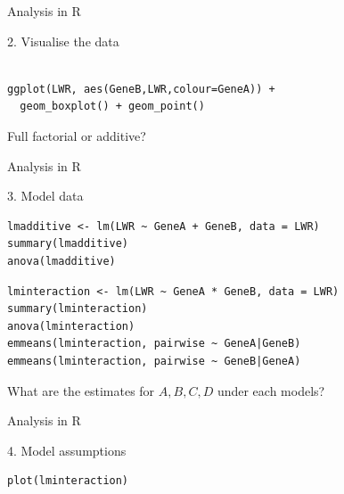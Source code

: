 \documentclass[10pt]{beamer}
\makeatletter
\newenvironment{kframe}{%
 \def\at@end@of@kframe{}%
 \ifinner\ifhmode%
  \def\at@end@of@kframe{\end{minipage}}%
  \begin{minipage}{\columnwidth}%
 \fi\fi%
 \def\FrameCommand##1{\hskip\@totalleftmargin \hskip-\fboxsep
 \colorbox{shadecolor}{##1}\hskip-\fboxsep
     \hskip-\linewidth \hskip-\@totalleftmargin \hskip\columnwidth}%
 \MakeFramed {\advance\hsize-\width
   \@totalleftmargin\z@ \linewidth\hsize
   \@setminipage}}%
 {\par\unskip\endMakeFramed%
 \at@end@of@kframe}
\newenvironment{knitrout}{}{} %
\makeatother
\begin{document}
\begin{frame}[fragile]{Analysis in R}
 
2. Visualise the data

 \begin{knitrout}
\color{fgcolor}\begin{kframe}
\begin{verbatim}

ggplot(LWR, aes(GeneB,LWR,colour=GeneA)) +
  geom_boxplot() + geom_point()
 \end{verbatim}
\end{kframe}
\end{knitrout}
 
 Full factorial or additive?
 
\end{frame}



\begin{frame}[fragile]{Analysis in R}
 
3. Model data

 \begin{knitrout}
\color{fgcolor}\begin{kframe}
\begin{verbatim}
lmadditive <- lm(LWR ~ GeneA + GeneB, data = LWR)
summary(lmadditive)
anova(lmadditive)
 \end{verbatim}
\end{kframe}
\end{knitrout}

 \begin{knitrout}
\color{fgcolor}\begin{kframe}
\begin{verbatim}
lminteraction <- lm(LWR ~ GeneA * GeneB, data = LWR)
summary(lminteraction)
anova(lminteraction)
emmeans(lminteraction, pairwise ~ GeneA|GeneB)
emmeans(lminteraction, pairwise ~ GeneB|GeneA)
 \end{verbatim}
\end{kframe}
\end{knitrout}

What are the estimates for $A, B, C, D$ under each models?
\end{frame}



\begin{frame}[fragile]{Analysis in R}
 
4. Model assumptions

 \begin{knitrout}
\color{fgcolor}\begin{kframe}
\begin{verbatim}
plot(lminteraction)
 \end{verbatim}
\end{kframe}
\end{knitrout}

\end{frame}
\end{document}
